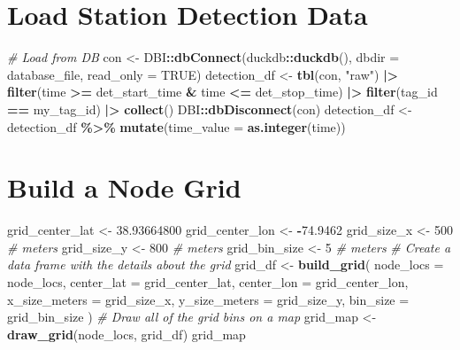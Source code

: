 \documentclass[
]{book}
\newenvironment{Shaded}{\begin{snugshade}}{\end{snugshade}}
\newcommand{\AttributeTok}[1]{\textcolor[rgb]{0.13,0.29,0.53}{#1}}
\newcommand{\CommentTok}[1]{\textcolor[rgb]{0.56,0.35,0.01}{\textit{#1}}}
\newcommand{\ConstantTok}[1]{\textcolor[rgb]{0.56,0.35,0.01}{#1}}
\newcommand{\DecValTok}[1]{\textcolor[rgb]{0.00,0.00,0.81}{#1}}
\newcommand{\FloatTok}[1]{\textcolor[rgb]{0.00,0.00,0.81}{#1}}
\newcommand{\FunctionTok}[1]{\textcolor[rgb]{0.13,0.29,0.53}{\textbf{#1}}}
\newcommand{\NormalTok}[1]{#1}
\newcommand{\OtherTok}[1]{\textcolor[rgb]{0.56,0.35,0.01}{#1}}
\newcommand{\SpecialCharTok}[1]{\textcolor[rgb]{0.81,0.36,0.00}{\textbf{#1}}}
\newcommand{\StringTok}[1]{\textcolor[rgb]{0.31,0.60,0.02}{#1}}
\begin{document}
\section{Load Station Detection Data}\label{load-station-detection-data-1}

\begin{Shaded}
\begin{Highlighting}[]
\CommentTok{\# Load from DB}
\NormalTok{con }\OtherTok{\textless{}{-}}\NormalTok{ DBI}\SpecialCharTok{::}\FunctionTok{dbConnect}\NormalTok{(duckdb}\SpecialCharTok{::}\FunctionTok{duckdb}\NormalTok{(), }\AttributeTok{dbdir =}\NormalTok{ database\_file, }\AttributeTok{read\_only =} \ConstantTok{TRUE}\NormalTok{)}
\NormalTok{detection\_df }\OtherTok{\textless{}{-}} \FunctionTok{tbl}\NormalTok{(con, }\StringTok{"raw"}\NormalTok{) }\SpecialCharTok{|\textgreater{}}
  \FunctionTok{filter}\NormalTok{(time }\SpecialCharTok{\textgreater{}=}\NormalTok{ det\_start\_time }\SpecialCharTok{\&}\NormalTok{ time }\SpecialCharTok{\textless{}=}\NormalTok{ det\_stop\_time) }\SpecialCharTok{|\textgreater{}}
  \FunctionTok{filter}\NormalTok{(tag\_id }\SpecialCharTok{==}\NormalTok{ my\_tag\_id) }\SpecialCharTok{|\textgreater{}}
  \FunctionTok{collect}\NormalTok{()}
\NormalTok{DBI}\SpecialCharTok{::}\FunctionTok{dbDisconnect}\NormalTok{(con)}
\NormalTok{detection\_df }\OtherTok{\textless{}{-}}\NormalTok{ detection\_df }\SpecialCharTok{\%\textgreater{}\%} \FunctionTok{mutate}\NormalTok{(}\AttributeTok{time\_value =} \FunctionTok{as.integer}\NormalTok{(time))}
\end{Highlighting}
\end{Shaded}

\section{Build a Node Grid}\label{build-a-node-grid}

\begin{Shaded}
\begin{Highlighting}[]
\NormalTok{grid\_center\_lat }\OtherTok{\textless{}{-}} \FloatTok{38.93664800}
\NormalTok{grid\_center\_lon }\OtherTok{\textless{}{-}} \SpecialCharTok{{-}}\FloatTok{74.9462}
\NormalTok{grid\_size\_x }\OtherTok{\textless{}{-}} \DecValTok{500} \CommentTok{\# meters}
\NormalTok{grid\_size\_y }\OtherTok{\textless{}{-}} \DecValTok{800} \CommentTok{\# meters}
\NormalTok{grid\_bin\_size }\OtherTok{\textless{}{-}} \DecValTok{5} \CommentTok{\# meters}
\CommentTok{\# Create a data frame with the details about the grid}
\NormalTok{grid\_df }\OtherTok{\textless{}{-}} \FunctionTok{build\_grid}\NormalTok{(}
  \AttributeTok{node\_locs =}\NormalTok{ node\_locs,}
  \AttributeTok{center\_lat =}\NormalTok{ grid\_center\_lat,}
  \AttributeTok{center\_lon =}\NormalTok{ grid\_center\_lon,}
  \AttributeTok{x\_size\_meters =}\NormalTok{ grid\_size\_x,}
  \AttributeTok{y\_size\_meters =}\NormalTok{ grid\_size\_y,}
  \AttributeTok{bin\_size =}\NormalTok{ grid\_bin\_size}
\NormalTok{)}
\CommentTok{\# Draw all of the grid bins on a map}
\NormalTok{grid\_map }\OtherTok{\textless{}{-}} \FunctionTok{draw\_grid}\NormalTok{(node\_locs, grid\_df)}
\NormalTok{grid\_map}
\end{Highlighting}
\end{Shaded}
\end{document}
